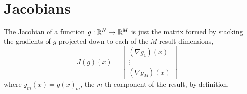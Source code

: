 \documentclass[10pt]{article}
\begin{document}
\section{Jacobians}

The Jacobian of a function $g : \mathbb{R}^N \rightarrow \mathbb{R}^M$ is just
the matrix formed by stacking the gradients of $g$ projected down to
each of the $M$ result dimensions,
%
\[
J(g)(x) = 
\left[
\begin{array}{c}
(\nabla g_1)(x)
\\[2pt]
\vdots
\\[2pt]
(\nabla g_M)(x)
\end{array}
\right]
\]
%
where $g_m(x) = g(x)_m$, the $m$-th component of the result, by definition.

\clearpage
\nocite{Hogan:2014}
\nocite{Neal:2003}



\end{document}
